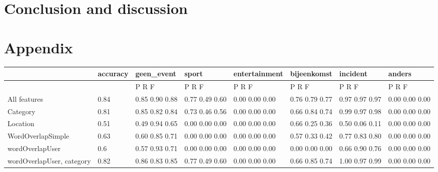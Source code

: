 \documentclass[
10pt, %
a4paper, %
oneside, %
headinclude,footinclude, %
BCOR5mm, %
]{scrartcl}
\begin{document}
\clearpage
\newpage
\section{Conclusion and discussion}
\lipsum[10]
\lipsum[10]

\newpage
\section{Appendix}

\begin{landscape}
\begin{table}[h]
\begin{tabular}{|l|l|l|l|l|l|l|l|}
\hline
                          & accuracy & geen\_event    & sport          & entertainment  & bijeenkomst    & incident       & anders         \\ \hline
                          &          & P    R    F    & P    R    F    & P    R    F    & P    R    F    & P    R    F    & P    R    F    \\ \hline
All features              & 0.84     & 0.85 0.90 0.88 & 0.77 0.49 0.60 & 0.00 0.00 0.00 & 0.76 0.79 0.77 & 0.97 0.97 0.97 & 0.00 0.00 0.00 \\ \hline
Category                  & 0.81     & 0.85 0.82 0.84 & 0.73 0.46 0.56 & 0.00 0.00 0.00 & 0.66 0.84 0.74 & 0.99 0.97 0.98 & 0.00 0.00 0.00 \\ \hline
Location                  & 0.51     & 0.49 0.94 0.65 & 0.00 0.00 0.00 & 0.00 0.00 0.00 & 0.66 0.25 0.36 & 0.50 0.06 0.11 & 0.00 0.00 0.00 \\ \hline
WordOverlapSimple         & 0.63     & 0.60 0.85 0.71 & 0.00 0.00 0.00 & 0.00 0.00 0.00 & 0.57 0.33 0.42 & 0.77 0.83 0.80 & 0.00 0.00 0.00 \\ \hline
wordOverlapUser           & 0.6      & 0.57 0.93 0.71 & 0.00 0.00 0.00 & 0.00 0.00 0.00 & 0.00 0.00 0.00 & 0.66 0.90 0.76 & 0.00 0.00 0.00 \\ \hline
wordOverlapUser, category & 0.82     & 0.86 0.83 0.85 & 0.77 0.49 0.60 & 0.00 0.00 0.00 & 0.66 0.85 0.74 & 1.00 0.97 0.99 & 0.00 0.00 0.00 \\ \hline
\end{tabular}
\end{table}
\end{landscape}




\end{document}
